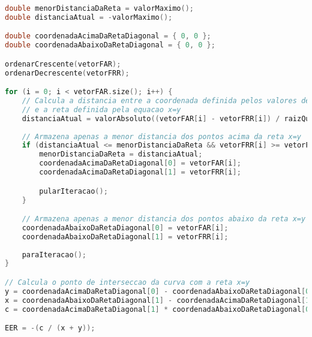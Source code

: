 \begin{lstlisting}[language=C++, caption={Algoritmo para o cálculo do EER}, captionpos=t, label={lst:EERAlgo}]
double menorDistanciaDaReta = valorMaximo();
double distanciaAtual = -valorMaximo();

double coordenadaAcimaDaRetaDiagonal = { 0, 0 };
double coordenadaAbaixoDaRetaDiagonal = { 0, 0 };

ordenarCrescente(vetorFAR);
ordenarDecrescente(vetorFRR);

for (i = 0; i < vetorFAR.size(); i++) {
	// Calcula a distancia entre a coordenada definida pelos valores de FAR e FRR
	// e a reta definida pela equacao x=y
	distanciaAtual = valorAbsoluto((vetorFAR[i] - vetorFRR[i]) / raizQuadrada(2));
	
	// Armazena apenas a menor distancia dos pontos acima da reta x=y
	if (distanciaAtual <= menorDistanciaDaReta && vetorFRR[i] >= vetorFAR[i]) {
		menorDistanciaDaReta = distanciaAtual;
		coordenadaAcimaDaRetaDiagonal[0] = vetorFAR[i];
		coordenadaAcimaDaRetaDiagonal[1] = vetorFRR[i];

		pularIteracao();
	}

	// Armazena apenas a menor distancia dos pontos abaixo da reta x=y
	coordenadaAbaixoDaRetaDiagonal[0] = vetorFAR[i];
	coordenadaAbaixoDaRetaDiagonal[1] = vetorFRR[i];
	
	paraIteracao();
}

// Calcula o ponto de interseccao da curva com a reta x=y
y = coordenadaAcimaDaRetaDiagonal[0] - coordenadaAbaixoDaRetaDiagonal[0] - 1;
x = coordenadaAbaixoDaRetaDiagonal[1] - coordenadaAcimaDaRetaDiagonal[1] + 1;
c = coordenadaAcimaDaRetaDiagonal[1] * coordenadaAbaixoDaRetaDiagonal[0] - coordenadaAcimaDaRetaDiagonal[0] * coordenadaAbaixoDaRetaDiagonal[1];

EER = -(c / (x + y));
\end{lstlisting}